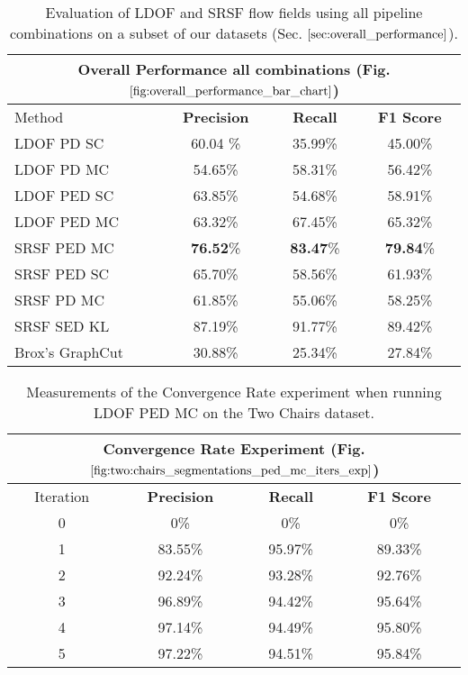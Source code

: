 \begin{table}[H]
\centering
\begin{tabular}{|l|c|c|c|}
\hline
\multicolumn{4}{|c|}{Overall Performance all combinations (Fig. $\ref{fig:overall_performance_bar_chart}$)}                        \\ \hline
Method & \textbf{Precision} & \textbf{Recall} & \textbf{F1 Score} \\ \hline
LDOF PD SC & 60.04 \%   & 35.99\%     & 45.00\%  \\ \hline
LDOF PD MC & 54.65\%   & 58.31\%     & 56.42\%  \\ \hline
LDOF PED SC & 63.85\%   & 54.68\%     & 58.91\%  \\ \hline
LDOF PED MC & 63.32\%   & 67.45\%     & 65.32\%  \\ \hline
SRSF PED MC & \textbf{76.52}\%   & \textbf{83.47}\%     & \textbf{79.84}\%  \\ \hline
SRSF PED SC & 65.70\%   & 58.56\%     & 61.93\%  \\ \hline 
SRSF PD MC & 61.85\%   & 55.06\%     & 58.25\%  \\ \hline
SRSF SED KL & 87.19\%   & 91.77\%     & 89.42\%  \\ \hline
Brox's GraphCut & 30.88\%   & 25.34\%     & 27.84\%  \\ \hline                   
\end{tabular}
\caption[Overall Performance]{Evaluation of LDOF and SRSF flow fields using all pipeline combinations on a subset of our datasets (Sec. $\ref{sec:overall_performance}$).}
\label{tab:overall_performance}
\end{table}

%
\begin{table}[H]
\centering
\begin{tabular}{|c|c|c|c|}
\hline
\multicolumn{4}{|c|}{Convergence Rate Experiment (Fig. $\ref{fig:two:chairs_segmentations_ped_mc_iters_exp}$)}                        \\ \hline
Iteration & \textbf{Precision} & \textbf{Recall} & \textbf{F1 Score} \\ \hline
0 & 0\%   & 0\%     & 0\%  \\ \hline
1 & 83.55\%   & 95.97\%     & 89.33\%  \\ \hline
2 & 92.24\%   & 93.28\%     & 92.76\%  \\ \hline 
3 & 96.89\%   & 94.42\%     & 95.64\%  \\ \hline
4 & 97.14\%   & 94.49\%     & 95.80\%  \\ \hline
5 & 97.22\%   & 94.51\%     & 95.84\%  \\ \hline               
\end{tabular}
\caption[Convergence PED MC]{Measurements of the Convergence Rate experiment when running LDOF PED MC on the Two Chairs dataset.}
\label{tab:two_chairs_ped_mc_iterations}
\end{table}
